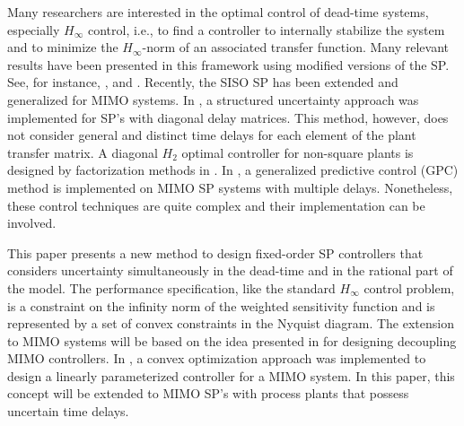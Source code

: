 \documentclass[default]{svmult}
\begin{document}
Many researchers are interested in the optimal control of dead-time
systems, especially $H_{\infty}$ control, i.e., to find a controller to
internally stabilize the system and to minimize the $H_{\infty}$-norm of an associated transfer
function. Many relevant results have been presented in this framework using 
modified versions of the SP. See, for instance, \cite{Mir03}, \cite{MZ00} and \cite{Zho03a}. Recently, the SISO SP has been extended and generalized for MIMO systems. In \cite{SBP09}, a structured uncertainty approach was implemented for SP's with diagonal delay matrices. This method, however, does not consider general and distinct time delays for each element of the plant transfer matrix. A diagonal $H_2$ optimal controller for non-square plants is designed by factorization methods in \cite{ZL06}. In \cite{NC00}, a generalized predictive control (GPC) method is implemented on MIMO SP systems with multiple delays.  
Nonetheless, these control techniques are quite complex and their implementation can be involved.



This paper presents a new method to design fixed-order SP controllers that considers uncertainty simultaneously in the dead-time and in the rational part of the model.  The performance specification, like the standard $H_{\infty}$ control problem, is a constraint on the infinity norm of the weighted sensitivity function and is represented by a set of convex constraints in the Nyquist diagram. The extension to MIMO systems will be based on the idea presented in \cite{GKL10b} for designing decoupling MIMO controllers. In \cite{GKL10b}, a convex optimization approach was implemented to design a linearly parameterized controller for a MIMO system. In this paper, this concept will be extended to MIMO SP's with process plants that possess uncertain time delays. 
\end{document}
